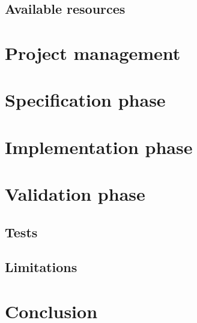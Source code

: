 \documentclass[openany]{book}
\begin{document}
    \section{Available resources}

  \chapter{Project management}

  \chapter{Specification phase}

  \chapter{Implementation phase}

  \chapter{Validation phase}
    \section{Tests}
    \section{Limitations}

  \chapter{Conclusion}

  \begin{thebibliography}{10}
  \end{thebibliography}
\end{document}
